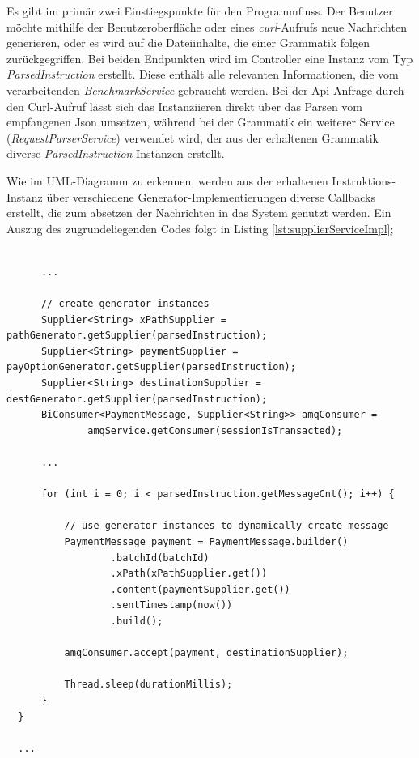 Es gibt im primär zwei Einstiegspunkte für den Programmfluss. Der Benutzer möchte mithilfe der Benutzeroberfläche oder eines \emph{curl}-Aufrufs neue Nachrichten generieren, oder es wird auf die Dateiinhalte, die einer Grammatik folgen zurückgegriffen. Bei beiden Endpunkten wird im Controller eine Instanz vom Typ \emph{ParsedInstruction} erstellt. Diese enthält alle relevanten Informationen, die vom verarbeitenden \emph{BenchmarkService} gebraucht werden. Bei der Api-Anfrage durch den Curl-Aufruf lässt sich das Instanziieren direkt über das Parsen vom empfangenen Json umsetzen, während bei der Grammatik ein weiterer Service (\emph{RequestParserService}) verwendet wird, der aus der erhaltenen Grammatik diverse \emph{ParsedInstruction} Instanzen erstellt.

Wie im UML-Diagramm zu erkennen, werden aus der erhaltenen Instruktions-Instanz über verschiedene Generator-Implementierungen diverse Callbacks erstellt, die zum absetzen der Nachrichten in das System genutzt werden. Ein Auszug des zugrundeliegenden Codes folgt in Listing \ref{lst:supplierServiceImpl};

\begin{minipage}{\linewidth}
\begin{lstlisting}[style=javaStyle,caption={Supplier - Service},label=lst:supplierServiceImpl]
  
      ...

      // create generator instances
      Supplier<String> xPathSupplier = pathGenerator.getSupplier(parsedInstruction);
      Supplier<String> paymentSupplier = payOptionGenerator.getSupplier(parsedInstruction);
      Supplier<String> destinationSupplier = destGenerator.getSupplier(parsedInstruction);
      BiConsumer<PaymentMessage, Supplier<String>> amqConsumer =
              amqService.getConsumer(sessionIsTransacted);

      ...

      for (int i = 0; i < parsedInstruction.getMessageCnt(); i++) {

          // use generator instances to dynamically create message
          PaymentMessage payment = PaymentMessage.builder()
                  .batchId(batchId)
                  .xPath(xPathSupplier.get())
                  .content(paymentSupplier.get())
                  .sentTimestamp(now())
                  .build();

          amqConsumer.accept(payment, destinationSupplier);

          Thread.sleep(durationMillis);
      }
  }

  ...
  
\end{lstlisting}
\end{minipage}

